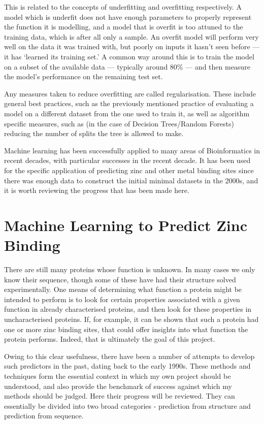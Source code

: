 This is related to the concepts of underfitting and overfitting respectively. A model which is underfit does not have enough parameters to properly represent the function it is modelling, and a model that is overfit is too attuned to the training data, which is after all only a sample. An overfit model will perform very well on the data it was trained with, but poorly on inputs it hasn't seen before --- it has `learned its training set.' A common way around this is to train the model on a subset of the available data --- typically around 80\% --- and then measure the model's performance on the remaining test set. 

Any measures taken to reduce overfitting are called regularisation. These include general best practices, such as the previously mentioned practice of evaluating a model on a different dataset from the one used to train it, as well as algorithm specific measures, such as (in the case of Decision Trees/Random Forests) reducing the number of splits the tree is allowed to make.

Machine learning has been successfully applied to many areas of Bioinformatics in recent decades, with particular successes in the recent decade. It has been used for the specific application of predicting zinc and other metal binding sites since there was enough data to construct the initial minimal datasets in the 2000s, and it is worth reviewing the progress that has been made here.

\section{Machine Learning to Predict Zinc Binding}

There are still many proteins whose function is unknown. In many cases we only know their sequence, though some of these have had their structure solved experimentally. One means of determining what function a protein might be intended to perform is to look for certain properties associated with a given function in already characterised proteins, and then look for these properties in uncharacterised proteins. If, for example, it can be shown that such a protein had one or more zinc binding sites, that could offer insights into what function the protein performs. Indeed, that is ultimately the goal of this project.

Owing to this clear usefulness, there have been a number of attempts to develop such predictors in the past, dating back to the early 1990s. These methods and techniques form the essential context in which my own project should be understood, and also provide the benchmark of success against which my methods should be judged. Here their progress will be reviewed. They can essentially be divided into two broad categories - prediction from structure and prediction from sequence.

